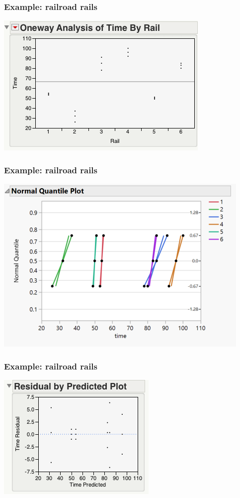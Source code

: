 \documentclass[handout]{beamer}\usepackage[]{graphicx}\usepackage[]{color}
\numberwithin{equation}{section}
\begin{document}
\begin{frame}
\frametitle{Example: railroad rails}
\begin{center}
 \includegraphics{../../fig/railplot.png}
\end{center}
\end{frame}

\begin{frame}
\frametitle{Example: railroad rails}
\begin{center}
 \includegraphics{../../fig/rails_QQ.png}
\end{center}
\end{frame}

\begin{frame}
\frametitle{Example: railroad rails}
\begin{center}
 \includegraphics{../../fig/railresid.png}
\end{center}
\end{frame}
\end{document}
